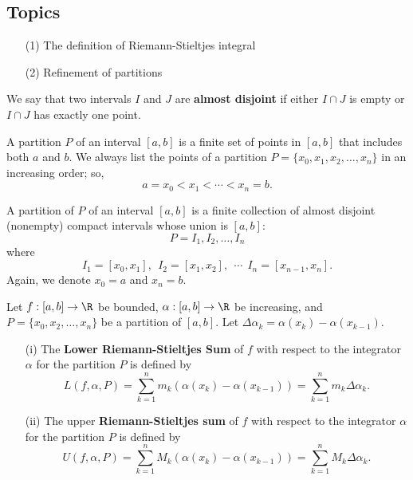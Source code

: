 \subsection{Topics}

\begin{enumerate}
    \item[(1)] The definition of Riemann-Stieltjes integral
    \item[(2)] Refinement of partitions 
\end{enumerate}

\begin{definition}
    We say that two intervals \( I  \) and \( J  \) are \textbf{almost disjoint} if either \( I \cap J  \) is empty or \(  I \cap J  \) has exactly one point.
\end{definition}

\begin{definition}[Partition]
    A partition \( P  \) of an interval \( [a,b] \) is a finite set of points in \( [a,b] \) that includes both \( a  \) and \( b  \). We always list the points of a partition \( P = \{  {x}_{0} , {x}_{1}, {x}_{2}, \dots, {x}_{n} \}  \) in an increasing order; so, 
    \[  a = {x}_{0} < {x}_{1}< \cdots < {x}_{n} = b.  \]
\end{definition}

\begin{remark}
    A partition of \( P  \) of an interval \( [a,b] \) is a finite collection of almost disjoint (nonempty) compact intervals whose union is \( [a,b] \): 
    \[  P = {I}_{1}, {I}_{2}, \dots, {I}_{n} \]
    where
    \[  {I}_{1} = [{x}_{0}, {x}_{1}], \ \ {I}_{2} = [{x}_{1}, {x}_{2}], \ \ \cdots \ \ {I}_{n} = [{x}_{n-1}, {x}_{n}]. \]
    Again, we denote \( {x}_{0} = a  \) and \( {x}_{n} = b  \).
\end{remark}

\begin{definition}
    Let \( f: [a,b] \to \R  \) be bounded, \( \alpha : [a,b] \to \R  \) be increasing, and \( P = \{ {x}_{0}, {x}_{2}, \dots, {x}_{n} \}  \) be a partition of \( [a,b] \). Let \( \Delta {\alpha}_{k} = \alpha({x}_{k}) - \alpha({x}_{k-1}) \). 
    \begin{enumerate}
        \item[(i)] The \textbf{Lower Riemann-Stieltjes Sum} of \( f  \) with respect to the integrator \( \alpha \) for the partition \( P  \) is defined by 
            \[  L(f, \alpha, P ) = \sum_{ k=1  }^{ n } {m}_{k} (\alpha({x}_{k}) - \alpha({x}_{k-1})) = \sum_{ k=1  }^{ n } {m}_{k} \Delta {\alpha}_{ k }. \] 
        \item[(ii)] The upper \textbf{Riemann-Stieltjes sum} of \( f  \) with respect to the integrator \( \alpha  \) for the partition \( P  \) is defined by
            \[  U(f, \alpha, P) = \sum_{ k=1  }^{ n } {M}_{k} (\alpha({x}_{k}) - \alpha({x}_{k-1})) = \sum_{ k=1  }^{ n } {M}_{k } \Delta {\alpha}_{k }. \]
    \end{enumerate}
\end{definition}

